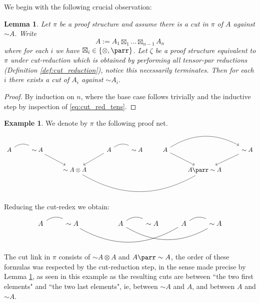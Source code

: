 \documentclass[12pt]{article}
\theoremstyle{plain}
\newtheorem{lemma}[thm]{Lemma}
\theoremstyle{definition}
\newtheorem{example}[thm]{Example}
\newcommand{\negation}{\sim}
\begin{document}
	
	We begin with the following crucial observation:
	\begin{lemma}\label{lem:GoI_lemma}
		Let $\pi$ be a proof structure and assume there is a cut in $\pi$ of $A$ against $\negation A$. Write
		\begin{equation}
			A :=  A_1 \boxtimes_1 \hdots \boxtimes_{n-1} A_n
		\end{equation}
		where for each $i$ we have $\boxtimes_i \in \lbrace \otimes, \parr\rbrace$. Let $\zeta$ be a proof structure equivalent to $\pi$ under cut-reduction which is obtained by performing all tensor-par reductions (Definition \ref{def:cut_reduction}), notice this necessarily terminates. Then for each $i$ there exists a cut of $A_i$ against $\negation A_i$.
	\end{lemma}
	\begin{proof}
		By induction on $n$, where the base case follows trivially and the inductive step by inspection of \eqref{eq:cut_red_tens}.
	\end{proof}
	\begin{example}
		We denote by $\pi$ the following proof net.
		\begin{equation}\label{eq:standard_example}
			\begin{tikzcd}
				{A}\arrow[r,bend left, dash] & {\negation A}\arrow[dr] & & {A}\arrow[dl]\arrow[r,bend left, dash] & {\negation A} & {A}\arrow[rr,bend left]\arrow[dr] & & {\negation A}\arrow[dl]\\
				& & {\negation A \otimes A}\arrow[rrrr, bend right, dash] & & & & {A \parr \negation A}
			\end{tikzcd}
		\end{equation}
		Reducing the cut-redex we obtain:
		\begin{equation}
			\begin{tikzcd}
				{A}\arrow[r,bend left,dash] & {\negation A}\arrow[rrrr,bend right,dash] & & { A}\arrow[r,bend left,dash]\arrow[rrr,bend right,dash] & {\negation A} & {A}\arrow[r,bend left,dash] & {\negation A}
			\end{tikzcd}
		\end{equation}
		The cut link in $\pi$ consists of $\negation A \otimes A$ and $A \parr \negation A$, the order of these formulas was respected by the cut-reduction step, in the sense made precise by Lemma \ref{lem:GoI_lemma}, as seen in this example as the resulting cuts are between ``the two first elements" and ``the two last elements", ie, between $\negation A$ and $A$, and between $A$ and $\negation A$.
	\end{example}
\end{document}
